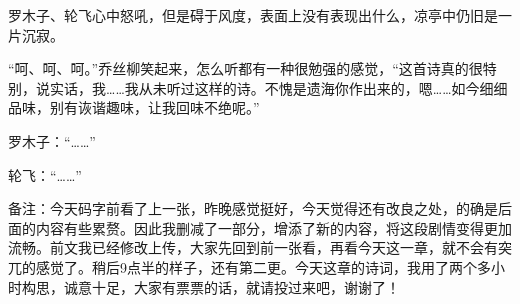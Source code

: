 \begin{this_body}
罗木子、轮飞心中怒吼，但是碍于风度，表面上没有表现出什么，凉亭中仍旧是一片沉寂。

“呵、呵、呵。”乔丝柳笑起来，怎么听都有一种很勉强的感觉，“这首诗真的很特别，说实话，我……我从未听过这样的诗。不愧是遗海你作出来的，嗯……如今细细品味，别有诙谐趣味，让我回味不绝呢。”

罗木子：“……”

轮飞：“……”

备注：今天码字前看了上一张，昨晚感觉挺好，今天觉得还有改良之处，的确是后面的内容有些累赘。因此我删减了一部分，增添了新的内容，将这段剧情变得更加流畅。前文我已经修改上传，大家先回到前一张看，再看今天这一章，就不会有突兀的感觉了。稍后9点半的样子，还有第二更。今天这章的诗词，我用了两个多小时构思，诚意十足，大家有票票的话，就请投过来吧，谢谢了！

\end{this_body}

